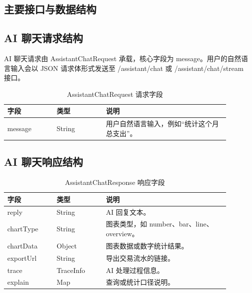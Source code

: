 \documentclass[bachelor, print]{xduthesis}
\begin{document}



\begin{appendix}

\chapter{主要接口与数据结构}

\section{AI 聊天请求结构}

AI 聊天请求由 AssistantChatRequest 承载，核心字段为 message。用户的自然语言输入会以 JSON 请求体形式发送至 /assistant/chat 或 /assistant/chat/stream 接口。

\begin{table}[H]
    \centering
    \caption{AssistantChatRequest 请求字段}
    \label{tab:assistant-request}
    \begin{tabular}{|p{0.2\linewidth}|p{0.2\linewidth}|p{0.5\linewidth}|}
        \hline
        字段 & 类型 & 说明 \\
        \hline
        message & String & 用户自然语言输入，例如“统计这个月总支出”。 \\
        \hline
    \end{tabular}
\end{table}

\section{AI 聊天响应结构}

\begin{table}[H]
    \centering
    \caption{AssistantChatResponse 响应字段}
    \label{tab:assistant-response}
    \begin{tabular}{|p{0.2\linewidth}|p{0.2\linewidth}|p{0.5\linewidth}|}
        \hline
        字段 & 类型 & 说明 \\
        \hline
        reply & String & AI 回复文本。 \\
        \hline
        chartType & String & 图表类型，如 number、bar、line、overview。 \\
        \hline
        chartData & Object & 图表数据或数字统计结果。 \\
        \hline
        exportUrl & String & 导出交易流水的链接。 \\
        \hline
        trace & TraceInfo & AI 处理过程信息。 \\
        \hline
        explain & Map & 查询或统计口径说明。 \\
        \hline
    \end{tabular}
\end{table}


\end{appendix}
\end{document}
